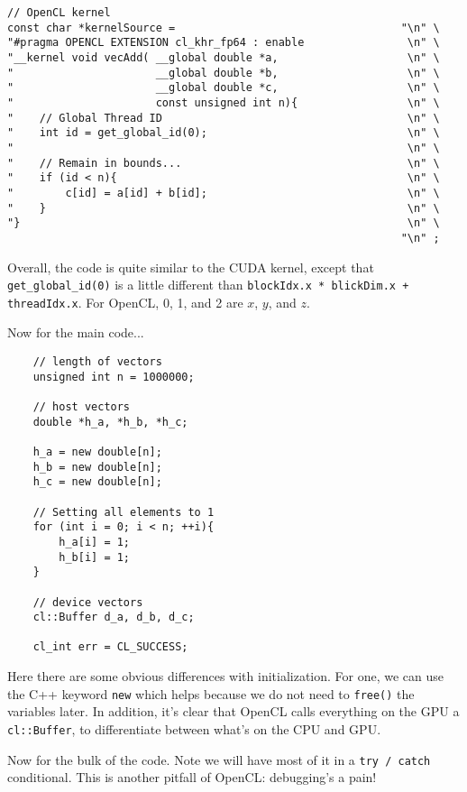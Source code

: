 \documentclass[11pt]{article}
\begin{document}
\begin{lstlisting}
// OpenCL kernel
const char *kernelSource =                                   "\n" \
"#pragma OPENCL EXTENSION cl_khr_fp64 : enable                \n" \
"__kernel void vecAdd( __global double *a,                    \n" \
"                      __global double *b,                    \n" \
"                      __global double *c,                    \n" \
"                      const unsigned int n){                 \n" \
"    // Global Thread ID                                      \n" \
"    int id = get_global_id(0);                               \n" \
"                                                             \n" \
"    // Remain in bounds...                                   \n" \
"    if (id < n){                                             \n" \
"        c[id] = a[id] + b[id];                               \n" \
"    }                                                        \n" \
"}                                                            \n" \
                                                             "\n" ;
\end{lstlisting}

Overall, the code is quite similar to the CUDA kernel, except that \lstinline{get_global_id(0)} is a little different than \lstinline{blockIdx.x * blickDim.x + threadIdx.x}. For OpenCL, 0, 1, and 2 are $x$, $y$, and $z$.

Now for the main code...
\begin{lstlisting}
    // length of vectors
    unsigned int n = 1000000;

    // host vectors
    double *h_a, *h_b, *h_c;

    h_a = new double[n];
    h_b = new double[n];
    h_c = new double[n];

    // Setting all elements to 1
    for (int i = 0; i < n; ++i){
        h_a[i] = 1;
        h_b[i] = 1;
    }

    // device vectors
    cl::Buffer d_a, d_b, d_c;

    cl_int err = CL_SUCCESS;
\end{lstlisting}

Here there are some obvious differences with initialization. For one, we can use the C++ keyword \lstinline{new} which helps because we do not need to \lstinline{free()} the variables later. In addition, it's clear that OpenCL calls everything on the GPU a \lstinline{cl::Buffer}, to differentiate between what's on the CPU and GPU. 

Now for the bulk of the code. Note we will have most of it in a \lstinline{try / catch} conditional. This is another pitfall of OpenCL: debugging's a pain!
\end{document}

